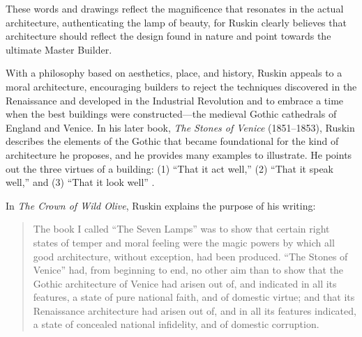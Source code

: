 These words and drawings reflect the magnificence that resonates in the
actual architecture, authenticating the lamp of beauty, for Ruskin
clearly believes that architecture should reflect the design found in
nature and point towards the ultimate Master Builder.  

With a philosophy based on aesthetics, place, and history, Ruskin
appeals to a moral architecture, encouraging builders to reject the
techniques discovered in the Renaissance and developed in the
Industrial Revolution and to embrace a time when the best buildings
were constructed—the medieval Gothic cathedrals of England and Venice. 
In his later book, \textit{The Stones of Venice }(1851--1853), Ruskin
describes the elements of the Gothic that became foundational for the
kind of architecture he proposes, and he provides many examples to
illustrate.  He points out the three virtues of a building: (1) “That
it act well,” (2) “That it speak well,” and (3) “That it look well” \citep[][vol. 1, ch. 2, sec. 1]{ruskin1885}. 
 
In \textit{The Crown of Wild Olive}, Ruskin
explains the purpose of his writing: 


\begin{quote}
The book I called ``The Seven Lamps'' was to show that certain right
states of temper and moral feeling were the magic powers by which all
good architecture, without exception, had been produced. 
``The Stones of Venice'' had, from beginning to end, no
other aim than to show that the Gothic architecture of Venice had
arisen out of, and indicated in all its features, a state of pure
national faith, and of domestic virtue; and that its Renaissance
architecture had arisen out of, and in all its features indicated, a
state of concealed national infidelity, and of  domestic corruption. 
\citep[][pp.~53]{ruskin1866}
\end{quote}

